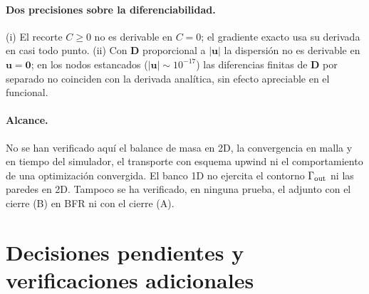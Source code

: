 \documentclass[11pt]{article}
\numberwithin{equation}{section}
\theoremstyle{plain}
\theoremstyle{definition}
\theoremstyle{remark}
\newcommand{\bu}{\mathbf{u}}
\newcommand{\bD}{\mathbf{D}}
\begin{document}
\paragraph{Dos precisiones sobre la diferenciabilidad.} (i) El recorte $C\ge0$ no es derivable en $C=0$; el gradiente
exacto usa su derivada en casi todo punto. (ii) Con $\bD$ proporcional a $|\bu|$ la dispersión no es derivable en $\bu=\mathbf 0$;
en los nodos estancados ($|\bu|\sim10^{-17}$) las diferencias finitas de $\bD$ por separado no coinciden con la
derivada analítica, sin efecto apreciable en el funcional.

\paragraph{Alcance.} No se han verificado aquí el balance de masa en 2D, la convergencia en malla y en tiempo del
simulador, el transporte con esquema upwind ni el comportamiento de una optimización convergida. El banco 1D no
ejercita el contorno $\Gamma_{\rm out}$ ni las paredes en 2D. Tampoco se ha verificado, en ninguna prueba, el adjunto con el cierre (B) en BFR ni con el cierre (A).

\section{Decisiones pendientes y verificaciones adicionales}
\label{sec:pendientes}
\end{document}
